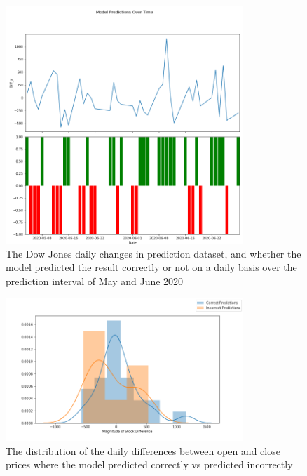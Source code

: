 \begin{figure}[H]
	\centering
	\includegraphics[width=0.8\textwidth]{images/model_pred_time.png}
	\caption{The Dow Jones daily changes in prediction dataset, and whether the model predicted the result correctly or not on a daily basis over the prediction interval of May and June 2020}
	\label{fig:modelpred}
\end{figure}


\begin{figure}[H]
	\centering
	\includegraphics[width=0.8\textwidth]{images/dist_of_model.png}
	\caption{The distribution of the daily differences between open and close prices where the model predicted correctly vs predicted incorrectly}
	\label{fig:distmodel}
\end{figure}

